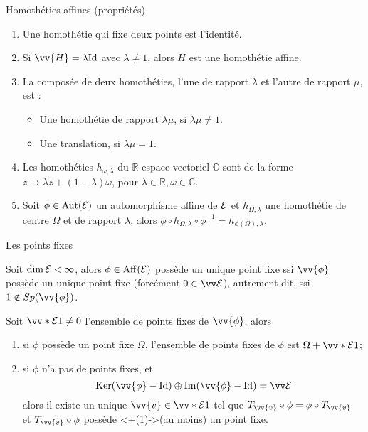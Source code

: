 \documentclass{m53beamer}
\begin{document}
  \begin{frame}{Homothéties affines (propriétés)}
    \begin{enumerate}[<+(1)->]
      \item Une homothétie qui fixe deux points est l'identité.
      \item Si $\vv{H}=\lambda\id$ avec $\lambda\neq1$, alors $H$ est une homothétie affine.
      \item La composée de deux homothéties, l'une de rapport $\lambda$ et l'autre de rapport $\mu$, est :
      \begin{itemize}[<+(1)->]
        \item Une homothétie de rapport $\lambda\mu$, si $\lambda\mu \neq 1$.
        \item Une translation, si $\lambda\mu=1$.
      \end{itemize}
      \item Les homothéties $h_{\omega,\lambda}$ du $\mathbb{R}$-espace vectoriel $\mathbb{C}$ sont de la forme $z \mapsto \lambda z + (1-\lambda)\omega$, pour $\lambda \in \mathbb{R}, \omega \in \mathbb{C}$.
      \item Soit $\phi \in \operatorname{Aut}(\mathcal{E})$ un automorphisme affine de $\mathcal{E}$ et $h_{\Omega,\lambda}$ une homothétie de centre $\Omega$ et de rapport $\lambda$, alors $\phi\circ h_{\Omega,\lambda}\circ\phi^{-1}=h_{\phi(\Omega),\lambda}$.
    \end{enumerate}
  \end{frame}
  \begin{frame}{Les points fixes}
    \begin{proposition}
      Soit $\dim \mathcal{E} < \infty$, alors $\phi\in\operatorname{Aff}(\mathcal{E})$ possède un unique point fixe ssi $\vv{\phi}$ possède un unique point fixe (forcément $0\in\ev{E}$)\pause, autrement dit, ssi $1 \notin Sp(\vv{\phi})$.
    \end{proposition}\pause
    \begin{proposition}
      Soit $\vv*{\ens{E}}{1} \neq 0$ l'ensemble de points fixes de $\vv{\phi}$, alors
      \begin{enumerate}[<+(1)->]
        \item si $\phi$ possède un point fixe $\Omega$, l'ensemble de points fixes de $\phi$ est $\Omega+\vv*{\ens{E}}{1}$;
        \item si $\phi$ n'a pas de points fixes\pause, et
          $$
            \ker(\vv{\phi}-\id) \oplus \im(\vv{\phi}-\id) = \ev{E}
          $$\pause
        alors il existe un unique $\vv{v}\in\vv*{\ens{E}}{1}$ tel que $T_{\vv{v}}\circ\phi=\phi\circ T_{\vv{v}}$\pause\\
        et $T_{\vv{v}}\circ\phi$ possède \uncover<+(1)->{(au moins)} un point fixe.
      \end{enumerate}
    \end{proposition}
  \end{frame}
\end{document}
